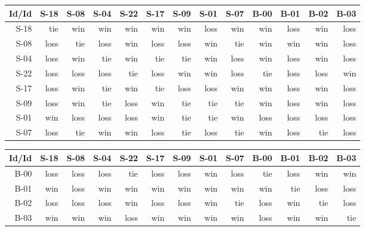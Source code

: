 \begin{tabular}{ | r | r | r | r | r | r | r | r | r | r | r | r | r | }
    \hline
        Id/Id  &   S-18  &   S-08  &   S-04  &   S-22  &   S-17  &   S-09  &   S-01  &   S-07  &   B-00  &   B-01  &   B-02  &   B-03  \\
    \hline
    \hline
         S-18  &    tie  &    win  &    win  &    win  &    win  &    win  &   loss  &    win  &    win  &   loss  &    win  &   loss  \\
    \hline
         S-08  &   loss  &    tie  &   loss  &    win  &   loss  &   loss  &    win  &    tie  &    win  &    win  &    win  &   loss  \\
    \hline
         S-04  &   loss  &    win  &    tie  &    win  &    tie  &    tie  &    win  &   loss  &    win  &   loss  &    win  &   loss  \\
    \hline
         S-22  &   loss  &   loss  &   loss  &    tie  &   loss  &    win  &    win  &   loss  &    tie  &   loss  &   loss  &    win  \\
    \hline
         S-17  &   loss  &    win  &    tie  &    win  &    tie  &   loss  &   loss  &    win  &    win  &   loss  &    win  &   loss  \\
    \hline
         S-09  &   loss  &    win  &    tie  &   loss  &    win  &    tie  &    tie  &    tie  &    win  &   loss  &    win  &   loss  \\
    \hline
         S-01  &    win  &   loss  &   loss  &   loss  &    win  &    tie  &    tie  &    win  &   loss  &   loss  &   loss  &   loss  \\
    \hline
         S-07  &   loss  &    tie  &    win  &    win  &   loss  &    tie  &   loss  &    tie  &    win  &   loss  &    tie  &   loss  \\
    \hline
\end{tabular}


\begin{tabular}{ | r | r | r | r | r | r | r | r | r | r | r | r | r | }
    \hline
        Id/Id  &   S-18  &   S-08  &   S-04  &   S-22  &   S-17  &   S-09  &   S-01  &   S-07  &   B-00  &   B-01  &   B-02  &   B-03  \\
    \hline
    \hline
         B-00  &   loss  &   loss  &   loss  &    tie  &   loss  &   loss  &    win  &   loss  &    tie  &   loss  &    win  &    win  \\
    \hline
         B-01  &    win  &   loss  &    win  &    win  &    win  &    win  &    win  &    win  &    win  &    tie  &   loss  &   loss  \\
    \hline
         B-02  &   loss  &   loss  &   loss  &    win  &   loss  &   loss  &    win  &    tie  &   loss  &    win  &    tie  &   loss  \\
    \hline
         B-03  &    win  &    win  &    win  &   loss  &    win  &    win  &    win  &    win  &   loss  &    win  &    win  &    tie  \\
    \hline
\end{tabular}


